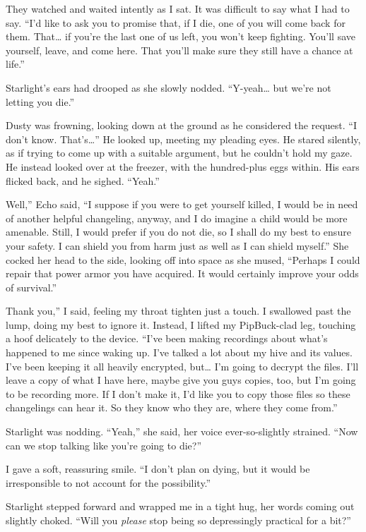 They watched and waited intently as I sat. It was difficult to say what I had to say. “I’d like to ask you to promise that, if I die, one of you will come back for them. That… if you’re the last one of us left, you won’t keep fighting. You’ll save yourself, leave, and come here. That you’ll make sure they still have a chance at life.”

Starlight’s ears had drooped as she slowly nodded. “Y-yeah… but we’re not letting you die.”

Dusty was frowning, looking down at the ground as he considered the request. “I don’t know. That’s…” He looked up, meeting my pleading eyes. He stared silently, as if trying to come up with a suitable argument, but he couldn’t hold my gaze. He instead looked over at the freezer, with the hundred-plus eggs within. His ears flicked back, and he sighed. “Yeah.”

\leavevmode{}Well,” Echo said, “I suppose if you were to get yourself killed, I would be in need of another helpful changeling, anyway, and I do imagine a child would be more amenable. Still, I would prefer if you do not die, so I shall do my best to ensure your safety. I can shield you from harm just as well as I can shield myself.” She cocked her head to the side, looking off into space as she mused, “Perhaps I could repair that power armor you have acquired. It would certainly improve your odds of survival.”

\leavevmode{}Thank you,” I said, feeling my throat tighten just a touch. I swallowed past the lump, doing my best to ignore it. Instead, I lifted my PipBuck-clad leg, touching a hoof delicately to the device. “I’ve been making recordings about what’s happened to me since waking up. I’ve talked a lot about my hive and its values. I’ve been keeping it all heavily encrypted, but… I’m going to decrypt the files. I’ll leave a copy of what I have here, maybe give you guys copies, too, but I’m going to be recording more. If I don’t make it, I’d like you to copy those files so these changelings can hear it. So they know who they are, where they come from.”

Starlight was nodding. “Yeah,” she said, her voice ever-so-slightly strained. “Now can we stop talking like you’re going to die?”

I gave a soft, reassuring smile. “I don’t plan on dying, but it would be irresponsible to not account for the possibility.”

Starlight stepped forward and wrapped me in a tight hug, her words coming out slightly choked. “Will you \textit{please} stop being so depressingly practical for a bit?”

